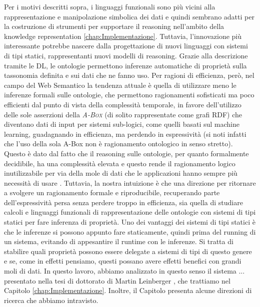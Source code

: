 Per i motivi descritti sopra, i linguaggi funzionali sono più vicini alla rappresentazione e manipolazione simbolica dei dati e quindi sembrano adatti per la costruzione di strumenti per supportare il reasoning nell'ambito della knowledge representation \ref{chap:Implementazione}.
Tuttavia, l'innovazione più interessante potrebbe nascere dalla progettazione di nuovi linguaggi con sistemi di tipi statici, rappresentanti nuovi modelli 
di reasoning. Grazie alla descrizione tramite le DL, le ontologie permettono inferenze automatiche di proprietà sulla tassonomia definita e sui dati che ne 
fanno uso. Per ragioni di efficienza, però, nel campo del Web Semantico la tendenza attuale è quella di utilizzare meno le inferenze formali sulle ontologie, 
che permettono ragionamenti sofisticati ma poco efficienti dal punto di vista della complessità temporale, in favore dell'utilizzo delle sole asserzioni 
della \textsc{\itshape A-Box} (di solito rappresentate come grafi RDF) che diventano dati di input per sistemi sub-logici, come quelli basati sul machine 
learning, guadagnando in efficienza, ma perdendo in espressività (si noti infatti che l'uso della sola A-Box non è ragionamento ontologico in senso stretto). 
Questo è dato dal fatto che il reasoning sulle ontologie, per quanto formalmente decidibile, ha una complessità elevata e questo rende il ragionamento logico 
inutilizzabile per via della mole di dati che le applicazioni hanno sempre più necessità di usare \cite{baader2017introductionDL}. Tuttavia, la nostra 
intuizione è che una direzione per ritornare a svolgere un ragionamento formale e riproducibile, recuperando parte dell'espressività persa senza perdere 
troppo in efficienza, sia quella di studiare calcoli e linguaggi funzionali di rappresentazione delle ontologie con sistemi di tipi statici per fare 
inferenza di proprietà. Uno dei vantaggi dei sistemi di tipi statici è che le inferenze si possono appunto fare staticamente, quindi prima del running di un 
sistema, evitando di appesantire il runtime con le inferenze. Si tratta di stabilire quali proprietà possono essere delegate a sistemi di tipi di questo 
genere e se, come in effetti pensiamo, questi possano avere effetti benefici con grandi moli di dati. In questo lavoro, abbiamo analizzato in questo senso il 
sistema ... presentato nella tesi di dottorato di Martin Leinberger \cite{leinbergerphdthesis}, che trattiamo nel Capitolo \ref{chap:Implementazione}. Inoltre, il Capitolo %
presenta alcune direzioni di ricerca che abbiamo intravisto.
